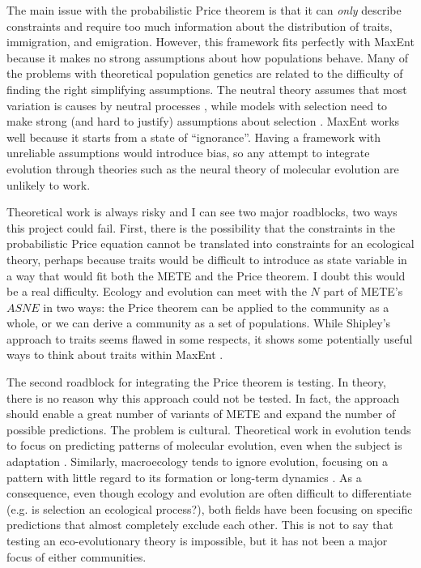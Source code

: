 \documentclass[letterpaper,12pt]{article}
\begin{document}
The main issue with the probabilistic Price theorem is that it can \emph
{only} describe constraints and require too much information about the
distribution of traits, immigration, and emigration. However, this framework
fits perfectly with MaxEnt because it makes no strong assumptions about how
populations behave. Many of the problems with theoretical population
genetics are related to the difficulty of finding the right simplifying
assumptions. The neutral theory assumes that most variation is causes by
neutral processes \cite{kim83,oht96}, while models with selection need to
make strong (and hard to justify) assumptions about selection \cite{gil01}.
MaxEnt works well because it starts from a state of ``ignorance''. Having a
framework with unreliable assumptions would introduce bias, so any attempt
to integrate evolution through theories such as the neural theory of
molecular evolution are unlikely to work.

Theoretical work is always risky and I can see two major roadblocks, two
ways this project could fail. First, there is the possibility that the
constraints in the probabilistic Price equation cannot be translated into
constraints for an ecological theory, perhaps because traits would be
difficult to introduce as state variable in a way that would fit both the
METE and the Price theorem. I doubt this would be a real difficulty. Ecology
and evolution can meet with the $N$ part of METE's $ASNE$ in two ways: the
Price theorem can be applied to the community as a whole, or we can derive a
community as a set of populations. While Shipley's approach to traits seems
flawed in some respects, it shows some potentially useful ways to think about
traits within MaxEnt \cite{shi10}.

The second roadblock for integrating the Price theorem is testing. In
theory, there is no reason why this approach could not be tested. In fact,
the approach should enable a great number of variants of METE and expand the
number of possible predictions. The problem is cultural. Theoretical work in
evolution tends to focus on predicting patterns of molecular evolution, even
when the subject is adaptation \cite{orr02,wil12}. Similarly, macroecology
tends to ignore evolution, focusing on a pattern with little regard to its
formation or long-term dynamics \cite{mcp07,ric08b}. As a consequence, even
though ecology and evolution are often difficult to differentiate (e.g. is
selection an ecological process?), both fields have been focusing on
specific predictions that almost completely exclude each other. This is not
to say that testing an eco-evolutionary theory is impossible, but it has not
been a major focus of either communities.
\end{document}
